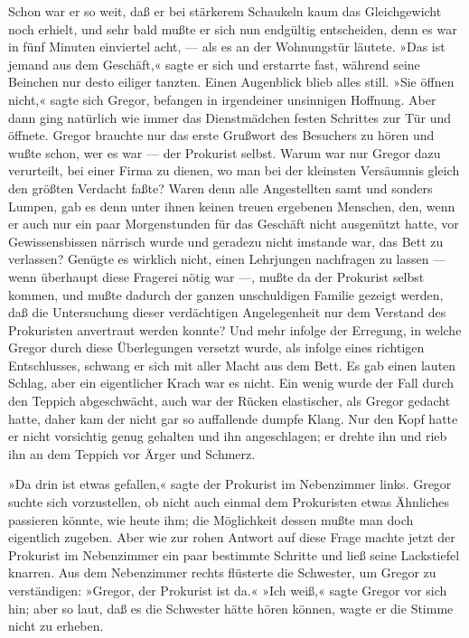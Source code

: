 Schon war er so weit, daß er bei stärkerem Schaukeln kaum das
Gleichgewicht noch erhielt, und sehr bald mußte er sich nun endgültig
entscheiden, denn es war in fünf Minuten einviertel acht, --- als es an
der Wohnungstür läutete. »Das ist jemand aus dem Geschäft,« sagte er
sich und erstarrte fast, während seine Beinchen nur desto eiliger
tanzten. Einen Augenblick blieb alles still. »Sie öffnen nicht,« sagte
sich Gregor, befangen in irgendeiner unsinnigen Hoffnung. Aber dann ging
natürlich wie immer das Dienstmädchen festen Schrittes zur Tür und
öffnete. Gregor brauchte nur das erste Grußwort des Besuchers zu hören
und wußte schon, wer es war --- der Prokurist selbst. Warum war nur
Gregor dazu verurteilt, bei einer Firma zu dienen, wo man bei der
kleinsten Versäumnis gleich den größten Verdacht faßte? Waren denn alle
Angestellten samt und sonders Lumpen, gab es denn unter ihnen keinen
treuen ergebenen Menschen, den, wenn er auch nur ein paar Morgenstunden
für das Geschäft nicht ausgenützt hatte, vor Gewissensbissen närrisch
wurde und geradezu nicht imstande war, das Bett zu verlassen? Genügte es
wirklich nicht, einen Lehrjungen nachfragen zu lassen --- wenn überhaupt
diese Fragerei nötig war ---, mußte da der Prokurist selbst kommen, und
mußte dadurch der ganzen unschuldigen Familie gezeigt werden, daß die
Untersuchung dieser verdächtigen Angelegenheit nur dem Verstand des
Prokuristen anvertraut werden konnte? Und mehr infolge der Erregung, in
welche Gregor durch diese Überlegungen versetzt wurde, als infolge eines
richtigen Entschlusses, schwang er sich mit aller Macht aus dem Bett. Es
gab einen lauten Schlag, aber ein eigentlicher Krach war es nicht. Ein
wenig wurde der Fall durch den Teppich abgeschwächt, auch war der Rücken
elastischer, als Gregor gedacht hatte, daher kam der nicht gar so
auffallende dumpfe Klang. Nur den Kopf hatte er nicht vorsichtig genug
gehalten und ihn angeschlagen; er drehte ihn und rieb ihn an dem Teppich
vor Ärger und Schmerz.

»Da drin ist etwas gefallen,« sagte der Prokurist im Nebenzimmer links.
Gregor suchte sich vorzustellen, ob nicht auch einmal dem Prokuristen
etwas Ähnliches passieren könnte, wie heute ihm; die Möglichkeit dessen
mußte man doch eigentlich zugeben. Aber wie zur rohen Antwort auf diese
Frage machte jetzt der Prokurist im Nebenzimmer ein paar bestimmte
Schritte und ließ seine Lackstiefel knarren. Aus dem Nebenzimmer rechts
flüsterte die Schwester, um Gregor zu verständigen: »Gregor, der
Prokurist ist da.« »Ich weiß,« sagte Gregor vor sich hin; aber so laut,
daß es die Schwester hätte hören können, wagte er die Stimme nicht zu
erheben.

